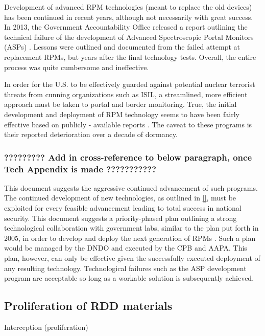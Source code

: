 \documentclass{report}
\begin{document}
Development of advanced RPM technologies (meant to replace the old devices) has been continued in recent years, although not necessarily with great success. In 2013, the Government Accountability Office released a report outlining the technical failure of the development of Advanced Spectroscopic Portal Monitors (ASPs) \cite{UnitedStatesGovernmentAccountabilityOffice2013}. Lessons were outlined and documented from the failed attempt at replacement RPMs, but years after the final technology tests. Overall, the entire process was quite cumbersome and ineffective. 

In order for the U.S. to be effectively guarded against potential nuclear terrorist threats from cunning organizations such as ISIL, a streamlined, more efficient approach must be taken to portal and border monitoring. True, the initial development and deployment of RPM technology seems to have been fairly effective based on publicly - available reports \cite{Simmons2005,DepartmentofHomelandSecurityDHS2013}. The caveat to these programs is their reported deterioration over a decade of dormancy. 

\subsubsection{?????????  Add in cross-reference to below paragraph, once Tech Appendix is made  ??????????? }

This document suggests the aggressive continued advancement of such programs. The continued development of new technologies, as outlined in \autoref{}, must be exploited for every feasible advancement leading to total success in national security. This document suggests a priority-phased plan outlining a strong technological collaboration with government labs, similar to the plan put forth in 2005, in order to develop and deploy the next generation of RPMs \cite{Simmons2005}. Such a plan would be managed by the DNDO and executed by the CPB and AAPA. This plan, however, can only be effective given the successfully executed deployment of any resulting technology. Technological failures such as the ASP development program are acceptable so long as a workable solution is subsequently achieved. 




\subsection{Proliferation of RDD materials}

Interception (proliferation)
 
\end{document}
